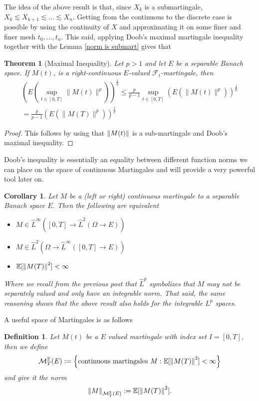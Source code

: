 \documentclass[12pt]{article}
\newtheorem{theorem}{Theorem}
\newtheorem{definition}{Definition}
\newtheorem{corollary}{Corollary}
\begin{document}
The idea of the above result is that, since $X_k$ is a submartingale, $X_k\lesssim X_{k+1}\lesssim...\lesssim X_n$. Getting from the continuous to the discrete case is possible by using the continuity of $X$ and approximating it on some finer and finer mesh $t_0,...,t_n$. This said, applying Doob's maximal martingale inequality together with the Lemma \ref{norm is submart} gives that
\begin{theorem}[Maximal Inequality]\label{doobs Hilbert} Let $p>1$ and let $E$ be a separable Banach space.
	If $M(t)$, is a right-continuous $E$-valued $\mathcal{F}_{t}$-martingale, then
	\begin{multline*}
		\left(E\left(\sup _{t \in[0, T]}\|M(t)\|^{p}\right)\right)^{\frac{1}{p}} \leq \frac{p}{p-1} \sup _{t \in[0, T]}\left(E\left(\|M(t)\|^{p}\right)\right)^{\frac{1}{p}} \\
		=\frac{p}{p-1}\left(E\left(\|M(T)\|^{p}\right)\right)^{\frac{1}{p}}
	\end{multline*}
\end{theorem}
\begin{proof}
	This follows by using that $\norm{M(t)}$ is a sub-martingale and Doob's maximal inequality.
\end{proof}
Doob's inequality is essentially an equality between different function norms we can place on the space of continuous Martingales and will provide a very powerful tool later on.
\begin{corollary}
	Let $M$ be a (left or right) continuous martingale to a separable Banach space $E$. Then the following are equivalent
	\begin{itemize}
		\item $M\in \hat{L}^\infty([0,T]\to \hat{L}^2(\Omega\to E))$
		\item  $M\in \hat{L}^2(\Omega\to \hat{L}^\infty([0,T]\to E))$
		\item $\mathbb{E}[\norm{M(T)}^2]<\infty$
	\end{itemize}
	Where we recall from the previous post that $\hat{L}^p$ symbolizes that $M$ may not be separately valued and only have an integrable norm. That said, the same reasoning shows that the above result also holds for the integrable $L^p$ spaces.
\end{corollary}
A useful space of Martingales is as follows
\begin{definition}
	Let $M(t)$ be a $E$ valued martingale with index set $I=[0,T]$, then we define
	\begin{equation*}
		\mathcal{M}_T^2(E):=\left\{\text{continuous martingales } M:\mathbb{E}[\norm{M(T)}^2]<\infty\right\}
	\end{equation*}
	and give it the norm
	\begin{equation*}
		\norm{M}_{\mathcal{M}_T^2(E)}:=\mathbb{E}[\norm{M(T)}^2].
	\end{equation*}
\end{definition}
\end{document}
